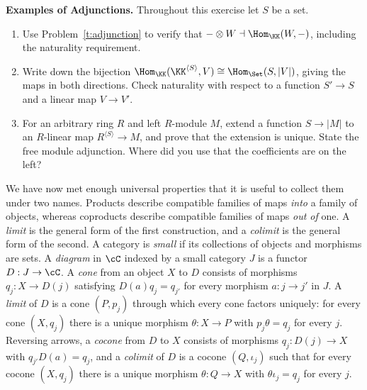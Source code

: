 \documentclass[12pt,reqno]{amsart}
\begin{document}
\hrulefill

\begin{problems}
\item\label{t:freeadjoints} \textbf{Examples of Adjunctions.} Throughout this exercise let $S$ be a set.
\begin{enumerate}
\item Use Problem~\ref{t:adjunction} to verify that $-\otimes W\dashv\Hom_{\KK}(W,-)$, including the naturality requirement.
\item Write down the bijection $\Hom_{\KK}(\KK^{\langle S\rangle},V)\cong\Hom_{\Set}(S,|V|)$, giving the maps in both directions. Check naturality with respect to a function $S'\to S$ and a linear map $V\to V'$.
\item For an arbitrary ring $R$ and left $R$-module $M$, extend a function $S\to|M|$ to an $R$-linear map $R^{\langle S\rangle}\to M$, and prove that the extension is unique. State the free module adjunction. Where did you use that the coefficients are on the left?
\end{enumerate}
\end{problems}

\hrulefill

We have now met enough universal properties that it is useful to collect them under two names. Products describe compatible families of maps \emph{into} a family of objects, whereas coproducts describe compatible families of maps \emph{out of} one. A \emph{limit} is the general form of the first construction, and a \emph{colimit} is the general form of the second. A category is \emph{small} if its collections of objects and morphisms are sets. A \emph{diagram} in $\cC$ indexed by a small category $J$ is a functor $D:J\to\cC$. A \emph{cone} from an object $X$ to $D$ consists of morphisms $q_j:X\to D(j)$ satisfying $D(a)q_j=q_{j'}$ for every morphism $a:j\to j'$ in $J$. A \emph{limit} of $D$ is a cone $(P,p_j)$ through which every cone factors uniquely: for every cone $(X,q_j)$ there is a unique morphism $\theta:X\to P$ with $p_j\theta=q_j$ for every $j$. Reversing arrows, a \emph{cocone} from $D$ to $X$ consists of morphisms $q_j:D(j)\to X$ with $q_{j'}D(a)=q_j$, and a \emph{colimit} of $D$ is a cocone $(Q,\iota_j)$ such that for every cocone $(X,q_j)$ there is a unique morphism $\theta:Q\to X$ with $\theta\iota_j=q_j$ for every $j$.
\end{document}

